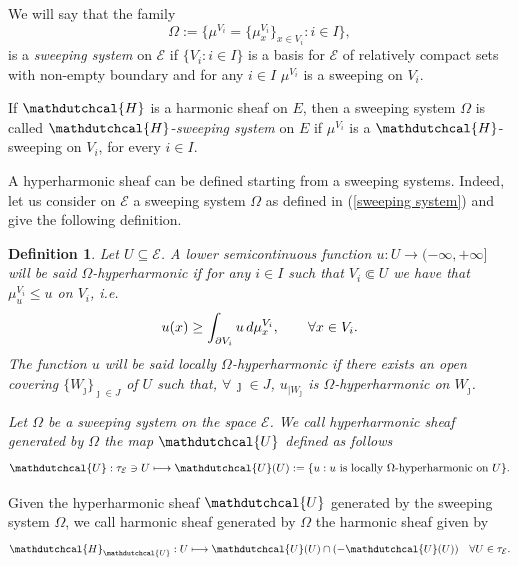 \documentclass{amsart}
\newtheorem{defn}[thm]{Definition}
\numberwithin{equation}{section}
\def \Hd{{\mathdutchcal{H}}}
\def \Ec{{\mathcal{E}}}
\def \Ud{{\mathdutchcal{U}}}
\begin{document}
{We will say that the family
\begin{equation}
	\label{sweeping system}
\Omega := \biggl\{\mu^{V_i}=\{\mu^{V_i}_x\}_{x \in V_i}: i \in {I}\biggl\},
\end{equation}
is a \textit{sweeping system} on $\Ec$ if $\{V_i : i \in {I}\}$ is a basis for $\Ec$ of relatively compact sets with non-empty boundary and for any $i \in {I}$ $\mu^{V_i}$ is a sweeping  on $V_i$. 
\vspace{2mm}

If $\Hd$ is a harmonic sheaf on $E$, then a sweeping system $\Omega$ is called $\Hd$-{\it sweeping system} on $E$ if $\mu^{V_i}$ is a $\Hd$-sweeping on $V_i$, for every $i \in I$. 

A hyperharmonic sheaf can be defined starting from a sweeping systems. Indeed, let  us consider on $\Ec$ a sweeping system $\Omega$ as defined in (\ref{sweeping system}) and give the following definition.

\begin{defn}\label{hyper sheaf generated by Omega}
Let $U \subseteq \Ec$. A lower semicontinuous function $u :U \rightarrow (-\infty,+\infty]$ will be said $\Omega$-\textup{hyperharmonic} if for any $i \in {I}$ such that $V_i \Subset U$ we have that $\mu^{V_i}_u \leq u$ on $V_i$, i.e.
\begin{equation*}
u(x) \geq \int_{\partial V_i}u \, {\rm d}\mu^{V_i}_x, \qquad \forall x \in V_i.
\end{equation*}
The function $u$ will be said \textup{locally $\Omega$-hyperharmonic} if there exists an open covering $\{W_\jmath\}_{\jmath \in J}$ of $U$ such that, $\forall \, \jmath \in J$, $u_{|W_\jmath}$ is $\Omega$-hyperharmonic on $W_\jmath$. 

Let $\Omega$ be a sweeping system on the space $\Ec$. We call \textup{hyperharmonic sheaf generated by $\Omega$} the map  $\Ud$ defined as follows
\[
\Ud: \tau_{\Ec} \ni U \longmapsto \Ud(U):=\{u : u \ \text{is locally $\Omega$-hyperharmonic on} \ U\}.
\]
\end{defn}

Given the hyperharmonic sheaf $\Ud$ generated by the sweeping system $\Omega$, we call \textup{harmonic sheaf generated by} $\Omega$ the harmonic sheaf given by
\[
\Hd_{\Ud}: U \longmapsto \Ud(U) \cap (-\Ud(U)) \quad \forall U \in \tau_{\Ec}.
\]

}
\end{document}

